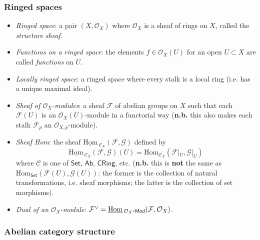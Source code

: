 \documentclass[10pt]{article}
\newcommand{\Set}{\mathsf{Set}}
\newcommand{\Ab}{\mathsf{Ab}}
\newcommand{\CRing}{\mathsf{CRing}}
\newcommand{\Mod}[1]{{#1}\hbox{-}\mathsf{Mod}}
\newcommand{\ccat}{\mathcal{C}}
\newcommand{\fsheaf}{\mathcal{F}}
\newcommand{\gsheaf}{\mathcal{G}}
\renewcommand{\O}{\mathcal{O}}
\newcommand{\dual}{\vee}
\newcommand{\Hom}{\mathrm{Hom}}
\newcommand{\sHom}{\underline{\mathrm{Hom}}\,}
\begin{document}
            \subsubsection{Ringed spaces}
                
                \begin{itemize}
                    \item \textit{Ringed space}: a pair $(X,\O_X)$ where $\O_X$ is a sheaf of rings on $X$, called the \textit{structure sheaf}.
                    \item \textit{Functions on a ringed space}: the elements $f\in\O_X(U)$ for an open $U\subset X$ are called \textit{functions} on $U$.
                    \item \textit{Locally ringed space}: a ringed space where every stalk is a local ring (i.e. has a unique maximal ideal).
                    \item \textit{Sheaf of $\O_X$-modules}: a sheaf $\fsheaf$ of abelian groups on $X$ such that each $\fsheaf(U)$ is an $\O_X(U)$-module in a functorial way (\textbf{n.b.} this also makes each stalk $\fsheaf_p$ an $\O_{X,p}$-module).
                    \item \textit{Sheaf Hom}: the sheaf $\sHom_{\ccat_X}(\fsheaf,\gsheaf)$ defined by
                        \[\sHom_{\ccat_X}(\fsheaf,\gsheaf)(U)=\Hom_{\ccat_X}(\fsheaf|_U,\gsheaf|_U)\]
                        where $\ccat$ is one of $\Set$, $\Ab$, $\CRing$, etc. (\textbf{n.b.} this is \textbf{not} the same as $\Hom_\Set(\fsheaf(U),\gsheaf(U))$: the former is the collection of natural transformations, i.e. sheaf morphisms; the latter is the collection of set morphisms).
                    \item \textit{Dual of an $\O_X$-module}: $\fsheaf^\dual = \sHom_{\Mod{\O_X}}(\fsheaf,\O_X)$.
                \end{itemize}
                    
            \subsubsection{Abelian category structure}    
                
\end{document}
